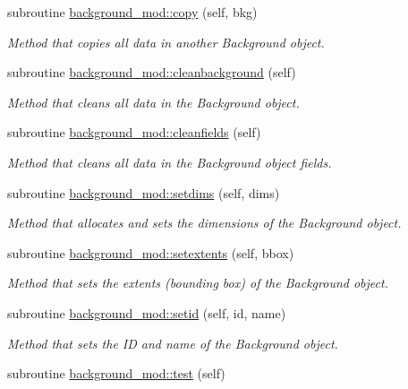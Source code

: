 \begin{DoxyCompactItemize}
subroutine \mbox{\hyperlink{namespacebackground__mod_ac6241a19bbe0f4b2482f95ed3d84056d}{background\+\_\+mod\+::copy}} (self, bkg)
\begin{DoxyCompactList}\small\item\em Method that copies all data in another Background object. \end{DoxyCompactList}\item 
subroutine \mbox{\hyperlink{namespacebackground__mod_a1610fcc9ce260beb3c35418e92a63391}{background\+\_\+mod\+::cleanbackground}} (self)
\begin{DoxyCompactList}\small\item\em Method that cleans all data in the Background object. \end{DoxyCompactList}\item 
subroutine \mbox{\hyperlink{namespacebackground__mod_a843a471a68ce83809e3ed0a40886a4e7}{background\+\_\+mod\+::cleanfields}} (self)
\begin{DoxyCompactList}\small\item\em Method that cleans all data in the Background object fields. \end{DoxyCompactList}\item 
subroutine \mbox{\hyperlink{namespacebackground__mod_a06d96d4627391d74feb105a842a87dc0}{background\+\_\+mod\+::setdims}} (self, dims)
\begin{DoxyCompactList}\small\item\em Method that allocates and sets the dimensions of the Background object. \end{DoxyCompactList}\item 
subroutine \mbox{\hyperlink{namespacebackground__mod_ae8871564866fdd657a25f6a5a2256c33}{background\+\_\+mod\+::setextents}} (self, bbox)
\begin{DoxyCompactList}\small\item\em Method that sets the extents (bounding box) of the Background object. \end{DoxyCompactList}\item 
subroutine \mbox{\hyperlink{namespacebackground__mod_a4feaccf688558d8590ece4f09c65c977}{background\+\_\+mod\+::setid}} (self, id, name)
\begin{DoxyCompactList}\small\item\em Method that sets the ID and name of the Background object. \end{DoxyCompactList}\item 
subroutine \mbox{\hyperlink{namespacebackground__mod_a3cee95b9b5d3aae83df33334981f2b27}{background\+\_\+mod\+::test}} (self)

\end{DoxyCompactItemize}
